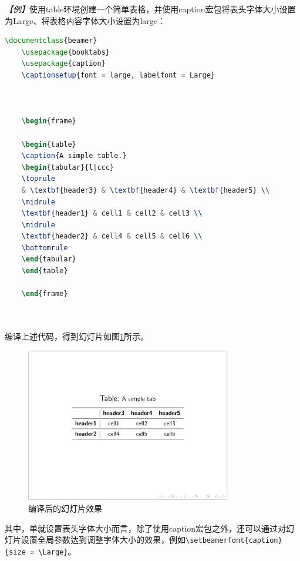 \emph{【例】}使用table环境创建一个简单表格，并使用caption宏包将表头字体大小设置为Large、将表格内容字体大小设置为large：
\begin{lstlisting}[language=TeX]
    \documentclass{beamer}
    \usepackage{booktabs}
    \usepackage{caption}
    \captionsetup{font = large, labelfont = Large}

    

    \begin{frame}

    \begin{table}
    \caption{A simple table.}
    \begin{tabular}{l|ccc}
    \toprule
    & \textbf{header3} & \textbf{header4} & \textbf{header5} \\
    \midrule
    \textbf{header1} & cell1 & cell2 & cell3 \\
    \midrule
    \textbf{header2} & cell4 & cell5 & cell6 \\
    \bottomrule
    \end{tabular}
    \end{table}

    \end{frame}

    
\end{lstlisting}

编译上述代码，得到幻灯片如图\ref{figeg:008}所示。

\begin{figure}[htbp]
    \centering
    \includegraphics[width = 0.8\textwidth]{images/ch_9/example_sec2_5.png}
    \caption{编译后的幻灯片效果}
    \label{figeg:008}
\end{figure}

其中，单就设置表头字体大小而言，除了使用caption宏包之外，还可以通过对幻灯片设置全局参数达到调整字体大小的效果，例如\texttt{\textbackslash{}setbeamerfont\{caption\}\{size = \textbackslash{}Large\}}。

